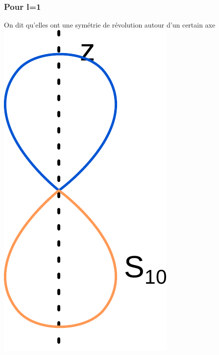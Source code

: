 \documentclass[french]{yLectureNote}
\begin{document}
\subsubsection{Pour l=1}
On dit qu'elles ont une symétrie de révolution autour d'un certain axe
\includegraphics[scale=0.3]{s10}
\end{document}

